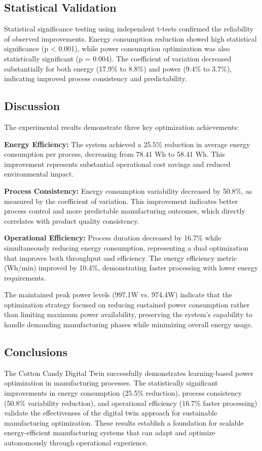 \subsection{Statistical Validation}

Statistical significance testing using independent t-tests confirmed the reliability of observed improvements. Energy consumption reduction showed high statistical significance (p < 0.001), while power consumption optimization was also statistically significant (p = 0.004). The coefficient of variation decreased substantially for both energy (17.9\% to 8.8\%) and power (9.4\% to 3.7\%), indicating improved process consistency and predictability.

\subsection{Discussion}

The experimental results demonstrate three key optimization achievements:

\textbf{Energy Efficiency:} The system achieved a 25.5\% reduction in average energy consumption per process, decreasing from 78.41 Wh to 58.41 Wh. This improvement represents substantial operational cost savings and reduced environmental impact.

\textbf{Process Consistency:} Energy consumption variability decreased by 50.8\%, as measured by the coefficient of variation. This improvement indicates better process control and more predictable manufacturing outcomes, which directly correlates with product quality consistency.

\textbf{Operational Efficiency:} Process duration decreased by 16.7\% while simultaneously reducing energy consumption, representing a dual optimization that improves both throughput and efficiency. The energy efficiency metric (Wh/min) improved by 10.4\%, demonstrating faster processing with lower energy requirements.

The maintained peak power levels (997.1W vs. 974.4W) indicate that the optimization strategy focused on reducing sustained power consumption rather than limiting maximum power availability, preserving the system's capability to handle demanding manufacturing phases while minimizing overall energy usage.

\subsection{Conclusions}

The Cotton Candy Digital Twin successfully demonstrates learning-based power optimization in manufacturing processes. The statistically significant improvements in energy consumption (25.5\% reduction), process consistency (50.8\% variability reduction), and operational efficiency (16.7\% faster processing) validate the effectiveness of the digital twin approach for sustainable manufacturing optimization. These results establish a foundation for scalable energy-efficient manufacturing systems that can adapt and optimize autonomously through operational experience.